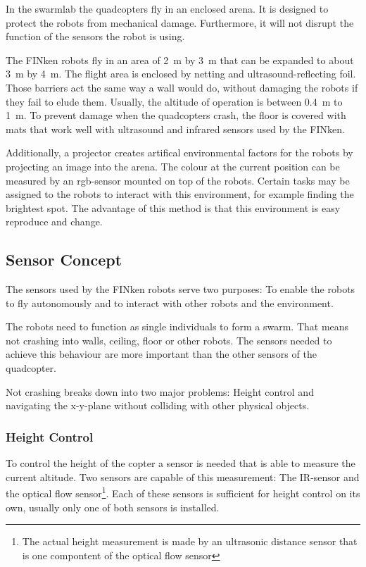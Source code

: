 In the swarmlab the quadcopters fly in an enclosed arena.
It is designed to protect the robots from mechanical damage.
Furthermore, it will not disrupt the function of the sensors the robot is using.

The FINken robots fly in an area of \SI{2}{\metre} by \SI{3}{\metre} that can be expanded to about \SI{3}{\metre} by \SI{4}{\metre}.
The flight area is enclosed by netting and ultrasound-reflecting foil.
Those barriers act the same way a wall would do, without damaging the robots if they fail to elude them.
Usually, the altitude of operation is between \SI{0.4}{\metre} to \SI{1}{\metre}.
To prevent damage when the quadcopters crash, the floor is covered with mats that work well with ultrasound and infrared sensors used by the FINken.

Additionally, a projector creates artifical environmental factors for the robots by projecting an image into the arena.
The colour at the current position can be measured by an rgb-sensor mounted on top of the robots.
Certain tasks may be assigned to the robots to interact with this environment, for example finding the brightest spot.
The advantage of this method is that this environment is easy reproduce and change.


\subsection{Sensor Concept}
The sensors used by the FINken robots serve two purposes: To enable the robots to fly autonomously and to interact with other robots and the environment.

The robots need to function as single individuals to form a swarm.
That means not crashing into walls, ceiling, floor or other robots.
The sensors needed to achieve this behaviour are more important than the other sensors of the quadcopter.

Not crashing breaks down into two major problems: Height control and navigating the x-y-plane without colliding with other physical objects.

\subsubsection*{Height Control}

To control the height of the copter a sensor is needed that is able to measure the current altitude.
Two sensors are capable of this measurement: The IR-sensor and the optical flow sensor\footnote{The actual height measurement is made by an ultrasonic distance sensor that is one compontent of the optical flow sensor}.
Each of these sensors is sufficient for height control on its own, usually only one of both sensors is installed.

